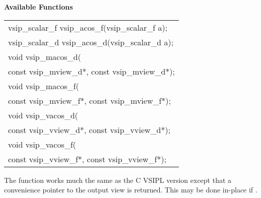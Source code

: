 \cvsiplh
\newline \hspace*{.8cm} \vspace*{.1cm} \textbf{Available Functions }
\newline \hspace*{1.1cm} {
\ttfamily
\begin{tabular}[H]{l}
vsip\_scalar\_f vsip\_acos\_f(vsip\_scalar\_f a);\\
vsip\_scalar\_d vsip\_acos\_d(vsip\_scalar\_d a);\\
void vsip\_macos\_d(\\*
\hspace{1cm}const vsip\_mview\_d*, const vsip\_mview\_d*);\\
void vsip\_macos\_f(\\*
\hspace{1cm}const vsip\_mview\_f*, const vsip\_mview\_f*);\\
void vsip\_vacos\_d(\\*
\hspace{1cm}const vsip\_vview\_d*, const vsip\_vview\_d*);\\
void vsip\_vacos\_f(\\*
\hspace{1cm}const vsip\_vview\_f*, const vsip\_vview\_f*);\\
\end{tabular}
}
\pyjvsiph
{}
\newline\hspace*{1.2cm}\parbox{10.8cm}{\vspace*{.1cm}The  function works much the same as the C VSIPL version except that a convenience pointer to the output view is returned. This may be done in-place if .}
